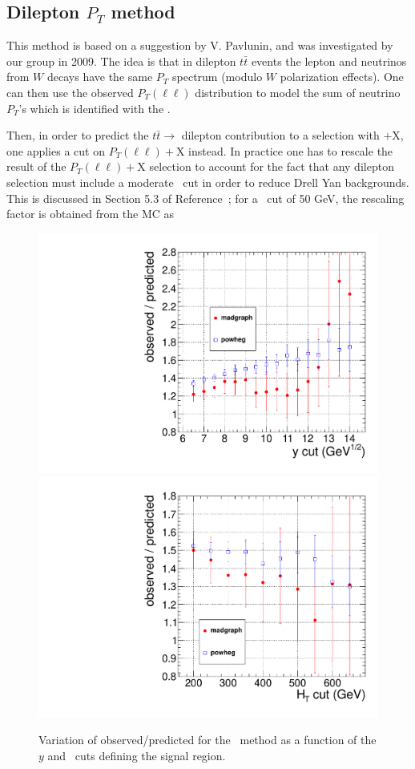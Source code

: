 \subsection{Dilepton $P_T$ method}
\label{sec:victory}
This method is based on a suggestion by V. Pavlunin\cite{ref:victory},
and was investigated by our group in 2009\cite{ref:ourvictory}.
The idea is that in dilepton $t\bar{t}$ events the lepton and neutrinos
from $W$ decays have the same $P_T$ spectrum (modulo $W$ polarization 
effects).  One can then use the observed 
$P_T(\ell\ell)$ distribution to model the sum of neutrino $P_T$'s which 
is identified with the \met.

Then, in order to predict the $t\bar{t} \to$ dilepton contribution to a 
selection with \met$+$X, one applies a cut on $P_T(\ell\ell)+$X instead.
In practice one has to rescale the result of the $P_T(\ell\ell)+$X selection
to account for the fact that any dilepton selection must include a 
moderate \met\ cut in order to reduce Drell Yan backgrounds.  This 
is discussed in Section 5.3 of Reference~\cite{ref:ourvictory}; for a \met\
cut of 50 GeV, the rescaling factor is obtained from the MC as

\begin{figure}[hbt]
\begin{center}
\includegraphics[width=0.48\linewidth]{plots/victory_yvary.pdf}
\includegraphics[width=0.48\linewidth]{plots/victory_htvary.pdf}
\caption{\label{fig:victory}\protect Variation of observed/predicted
for the \ptll\ method as a function of the $y$ and \Ht\ cuts defining
the signal region.}
\end{center}
\end{figure}


